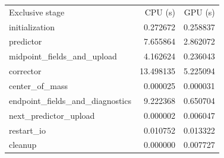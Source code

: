 \begin{tabular}{lrr}
\toprule
Exclusive stage & CPU (s) & GPU (s) \\
initialization & 0.272672 & 0.258837 \\
predictor & 7.655864 & 2.862072 \\
midpoint\_fields\_and\_upload & 4.162624 & 0.236043 \\
corrector & 13.498135 & 5.225094 \\
center\_of\_mass & 0.000025 & 0.000031 \\
endpoint\_fields\_and\_diagnostics & 9.222368 & 0.650704 \\
next\_predictor\_upload & 0.000002 & 0.006047 \\
restart\_io & 0.010752 & 0.013322 \\
cleanup & 0.000000 & 0.007727 \\
\bottomrule
\end{tabular}
